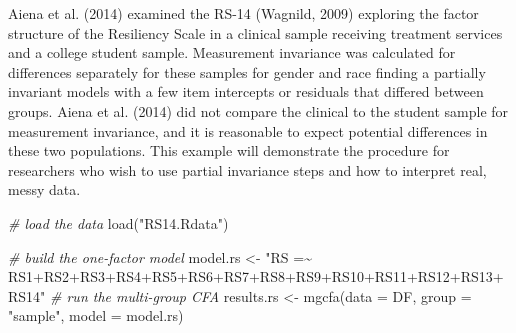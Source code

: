\documentclass[
  man]{apa7}
\newenvironment{Shaded}{\begin{snugshade}}{\end{snugshade}}
\newcommand{\AttributeTok}[1]{\textcolor[rgb]{0.77,0.63,0.00}{#1}}
\newcommand{\CommentTok}[1]{\textcolor[rgb]{0.56,0.35,0.01}{\textit{#1}}}
\newcommand{\FunctionTok}[1]{\textcolor[rgb]{0.00,0.00,0.00}{#1}}
\newcommand{\NormalTok}[1]{#1}
\newcommand{\OtherTok}[1]{\textcolor[rgb]{0.56,0.35,0.01}{#1}}
\newcommand{\SpecialCharTok}[1]{\textcolor[rgb]{0.00,0.00,0.00}{#1}}
\newcommand{\StringTok}[1]{\textcolor[rgb]{0.31,0.60,0.02}{#1}}
\begin{document}
Aiena et al. (2014) examined the RS-14 (Wagnild, 2009) exploring the factor structure of the Resiliency Scale in a clinical sample receiving treatment services and a college student sample. Measurement invariance was calculated for differences separately for these samples for gender and race finding a partially invariant models with a few item intercepts or residuals that differed between groups. Aiena et al. (2014) did not compare the clinical to the student sample for measurement invariance, and it is reasonable to expect potential differences in these two populations. This example will demonstrate the procedure for researchers who wish to use partial invariance steps and how to interpret real, messy data.

\small

\begin{Shaded}
\begin{Highlighting}[]
\CommentTok{\# load the data}
\FunctionTok{load}\NormalTok{(}\StringTok{"RS14.Rdata"}\NormalTok{)}

\CommentTok{\# build the one{-}factor model }
\NormalTok{model.rs }\OtherTok{\textless{}{-}} \StringTok{"RS =\textasciitilde{} RS1+RS2+RS3+RS4+RS5+RS6+RS7+RS8+RS9+RS10+RS11+RS12+RS13+RS14"}
\CommentTok{\# run the multi{-}group CFA}
\NormalTok{results.rs }\OtherTok{\textless{}{-}} \FunctionTok{mgcfa}\NormalTok{(}\AttributeTok{data =}\NormalTok{ DF, }
                    \AttributeTok{group =} \StringTok{"sample"}\NormalTok{, }
                    \AttributeTok{model =}\NormalTok{ model.rs)}
\end{Highlighting}
\end{Shaded}

\normalsize

\small

\begin{Shaded}
\end{Shaded}

\normalsize
\end{document}

